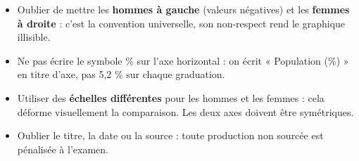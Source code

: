 \documentclass[11pt]{article}
\begin{document}
\begin{attention}
\begin{itemize}
\item Oublier de mettre les \textbf{hommes à gauche} (valeurs négatives) et les \textbf{femmes à droite} : c'est la convention universelle, son non-respect rend le graphique illisible.
\item Ne pas écrire le symbole \% sur l'axe horizontal : on écrit « Population (\%) » en titre d'axe, pas 5,2 \% sur chaque graduation.
\item Utiliser des \textbf{échelles différentes} pour les hommes et les femmes : cela déforme visuellement la comparaison. Les deux axes doivent être symétriques.
\item Oublier le titre, la date ou la source : toute production non sourcée est pénalisée à l'examen.
\end{itemize}
\end{attention}
\end{document}
